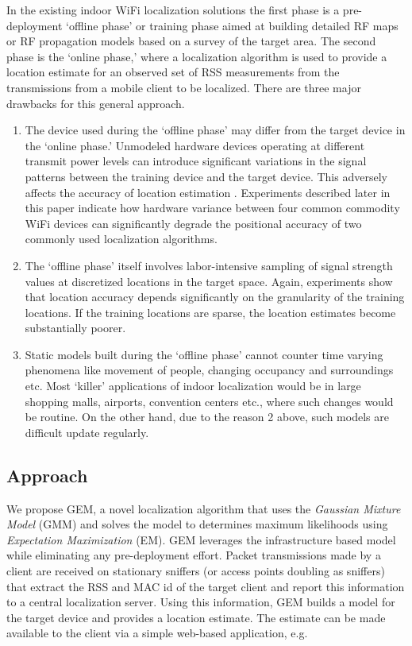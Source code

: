 In the existing indoor WiFi localization solutions the first phase is a pre-deployment `offline phase' or training phase aimed at building detailed RF maps or RF propagation models based on a survey of the target area. The second phase is the `online phase,' where a localization algorithm is used to provide a location estimate for an observed set of RSS measurements from the transmissions
from a mobile client to be localized. There are three major drawbacks for this general approach. 
\begin{enumerate}
\item
The device used during the `offline phase' may differ from the target device in the `online phase.' Unmodeled hardware devices operating at different transmit power levels can introduce significant variations in the signal patterns between the training device and the target device. This adversely affects the accuracy of location estimation \cite{Tsui:2009:ULS:1741410.1741596}. Experiments described later in this paper indicate how hardware variance between four common commodity WiFi devices can significantly degrade the positional accuracy of two commonly used localization algorithms. 
\item
The `offline phase' itself involves labor-intensive sampling of signal strength values at discretized locations in the target space. Again, experiments show that location accuracy depends significantly on the granularity of the training locations. If the training locations are sparse, the location estimates become substantially poorer.
\item
Static models built during the `offline phase' cannot counter time varying phenomena like movement of people, changing occupancy and surroundings etc. Most 
`killer' applications of indoor localization would be in large shopping malls, airports, 
convention centers etc., where such changes would be routine. 
On the other hand, due to the reason 2 above, such models are difficult update regularly. 
\end{enumerate}

\subsection{Approach}

We propose GEM, a novel localization algorithm that uses the \emph{Gaussian Mixture Model} (GMM) and solves the model to determines
maximum likelihoods using \emph{Expectation Maximization} (EM). 
GEM leverages the infrastructure based model while eliminating any pre-deployment effort. Packet transmissions made by a client are received on stationary sniffers (or access points doubling as sniffers) that extract the RSS and MAC id of the target client and report this information to a central localization server. Using this information, GEM builds a model for the target device and provides 
a location estimate. The estimate can be made available to the client via a simple web-based
application, e.g. 

